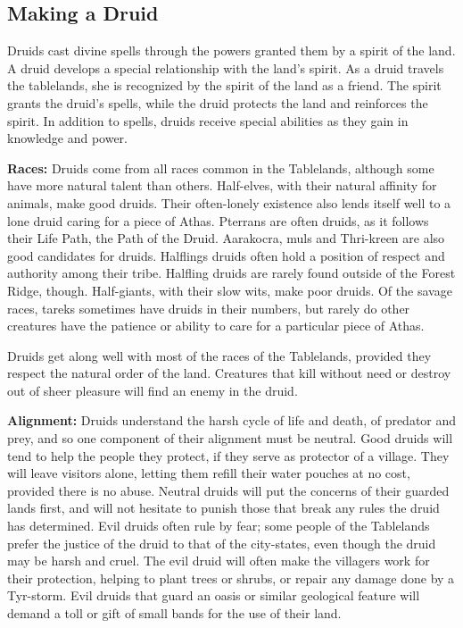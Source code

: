 \subsection{Making a Druid}
Druids cast divine spells through the powers granted them by a spirit of the land. A druid develops a special relationship with the land's spirit. As a druid travels the tablelands, she is recognized by the spirit of the land as a friend. The spirit grants the druid's spells, while the druid protects the land and reinforces the spirit. In addition to spells, druids receive special abilities as they gain in knowledge and power.

\textbf{Races:} Druids come from all races common in the Tablelands, although some have more natural talent than others. Half-elves, with their natural affinity for animals, make good druids. Their often-lonely existence also lends itself well to a lone druid caring for a piece of Athas. Pterrans are often druids, as it follows their Life Path, the Path of the Druid. Aarakocra, muls and Thri-kreen are also good candidates for druids. Halflings druids often hold a position of respect and authority among their tribe. Halfling druids are rarely found outside of the Forest Ridge, though. Half-giants, with their slow wits, make poor druids. Of the savage races, tareks sometimes have druids in their numbers, but rarely do other creatures have the patience or ability to care for a particular piece of Athas.

Druids get along well with most of the races of the Tablelands, provided they respect the natural order of the land. Creatures that kill without need or destroy out of sheer pleasure will find an enemy in the druid.

\textbf{Alignment:} Druids understand the harsh cycle of life and death, of predator and prey, and so one component of their alignment must be neutral. Good druids will tend to help the people they protect, if they serve as protector of a village. They will leave visitors alone, letting them refill their water pouches at no cost, provided there is no abuse. Neutral druids will put the concerns of their guarded lands first, and will not hesitate to punish those that break any rules the druid has determined. Evil druids often rule by fear; some people of the Tablelands prefer the justice of the druid to that of the city-states, even though the druid may be harsh and cruel. The evil druid will often make the villagers work for their protection, helping to plant trees or shrubs, or repair any damage done by a Tyr-storm. Evil druids that guard an oasis or similar geological feature will demand a toll or gift of small bands for the use of their land.

